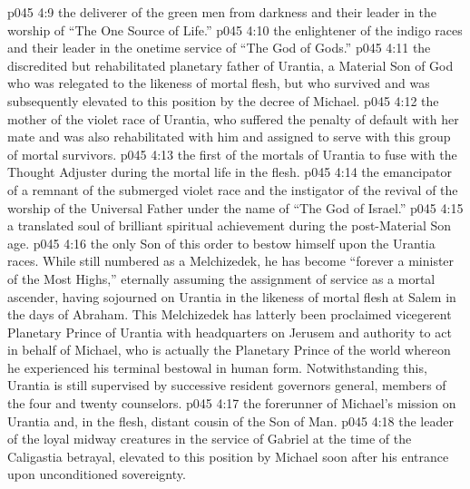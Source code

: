 \vs p045 4:9 \pc {}\bibnobreakspace {} the deliverer of the green men from darkness and their leader in the worship of “The One Source of Life.”
\vs p045 4:10 \pc {}\bibnobreakspace {} the enlightener of the indigo races and their leader in the onetime service of “The God of Gods.”
\vs p045 4:11 \pc {}\bibnobreakspace {} the discredited but rehabilitated planetary father of Urantia, a Material Son of God who was relegated to the likeness of mortal flesh, but who survived and was subsequently elevated to this position by the decree of Michael.
\vs p045 4:12 \pc {}\bibnobreakspace {} the mother of the violet race of Urantia, who suffered the penalty of default with her mate and was also rehabilitated with him and assigned to serve with this group of mortal survivors.
\vs p045 4:13 \pc {}\bibnobreakspace {} the first of the mortals of Urantia to fuse with the Thought Adjuster during the mortal life in the flesh.
\vs p045 4:14 \pc {}\bibnobreakspace {} the emancipator of a remnant of the submerged violet race and the instigator of the revival of the worship of the Universal Father under the name of “The God of Israel.”
\vs p045 4:15 \pc {}\bibnobreakspace {} a translated soul of brilliant spiritual achievement during the post\hyp{}Material Son age.
\vs p045 4:16 \pc {}\bibnobreakspace {} the only Son of this order to bestow himself upon the Urantia races. While still numbered as a Melchizedek, he has become “forever a minister of the Most Highs,” eternally assuming the assignment of service as a mortal ascender, having sojourned on Urantia in the likeness of mortal flesh at Salem in the days of Abraham. This Melchizedek has latterly been proclaimed vicegerent Planetary Prince of Urantia with headquarters on Jerusem and authority to act in behalf of Michael, who is actually the Planetary Prince of the world whereon he experienced his terminal bestowal in human form. Notwithstanding this, Urantia is still supervised by successive resident governors general, members of the four and twenty counselors.
\vs p045 4:17 \pc {}\bibnobreakspace {} the forerunner of Michael’s mission on Urantia and, in the flesh, distant cousin of the Son of Man.
\vs p045 4:18 \pc {}\bibnobreakspace {} the leader of the loyal midway creatures in the service of Gabriel at the time of the Caligastia betrayal, elevated to this position by Michael soon after his entrance upon unconditioned sovereignty.
